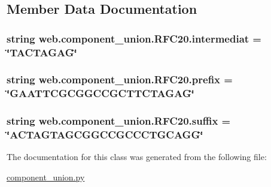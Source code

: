 \subsection{Member Data Documentation}
\hypertarget{classweb_1_1component__union_1_1_r_f_c20_ae0900321fd9f180c245efe9f05628326}{
\subsubsection[{intermediat}]{\setlength{\rightskip}{0pt plus 5cm}string web.\-component\-\_\-union.\-R\-F\-C20.\-intermediat = \char`\"{}T\-A\-C\-T\-A\-G\-A\-G\char`\"{}\hspace{0.3cm}{\ttfamily [static]}}}\label{classweb_1_1component__union_1_1_r_f_c20_ae0900321fd9f180c245efe9f05628326}
\hypertarget{classweb_1_1component__union_1_1_r_f_c20_ab205c2c6376fb4675b10f603414a0231}{
\subsubsection[{prefix}]{\setlength{\rightskip}{0pt plus 5cm}string web.\-component\-\_\-union.\-R\-F\-C20.\-prefix = \char`\"{}G\-A\-A\-T\-T\-C\-G\-C\-G\-G\-C\-C\-G\-C\-T\-T\-C\-T\-A\-G\-A\-G\char`\"{}\hspace{0.3cm}{\ttfamily [static]}}}\label{classweb_1_1component__union_1_1_r_f_c20_ab205c2c6376fb4675b10f603414a0231}
\hypertarget{classweb_1_1component__union_1_1_r_f_c20_a55fba88b8140182ab2640398452cd379}{
\subsubsection[{suffix}]{\setlength{\rightskip}{0pt plus 5cm}string web.\-component\-\_\-union.\-R\-F\-C20.\-suffix = \char`\"{}A\-C\-T\-A\-G\-T\-A\-G\-C\-G\-G\-C\-C\-G\-C\-C\-C\-T\-G\-C\-A\-G\-G\char`\"{}\hspace{0.3cm}{\ttfamily [static]}}}\label{classweb_1_1component__union_1_1_r_f_c20_a55fba88b8140182ab2640398452cd379}


The documentation for this class was generated from the following file\-:\begin{DoxyCompactItemize}
\item 
\hyperlink{component__union_8py}{component\-\_\-union.\-py}\end{DoxyCompactItemize}
